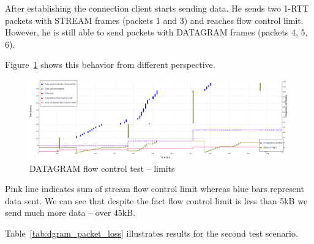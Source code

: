 After establishing the connection client starts sending data.
He sends two 1-RTT packets with STREAM frames (packets 1 and 3) and reaches flow control limit.
However, he is still able to send packets with DATAGRAM frames (packets 4, 5, 6).

Figure~\ref{fig:dgram_flow_control2} shows this behavior from different perspective.
\begin{figure}
    \centering
    \includegraphics[width=\textwidth]{img/__09__datagrams/dgram_flow_control_2.png}
    \caption{DATAGRAM flow control test -- limits}
    \label{fig:dgram_flow_control2}
\end{figure}
Pink line indicates sum of stream flow control limit whereas blue bars represent data sent.
We can see that despite the fact flow control limit is less than 5kB we send much more data -- over 45kB\@.

Table~\ref{tab:dgram_packet_loss} illustrates results for the second test scenario.

\begin{table}[h]
    \centering
    \caption{\label{tab:dgram_packet_loss}Number of packets sent with and without packet loss for DATAGRAM frames.}
\end{table}

